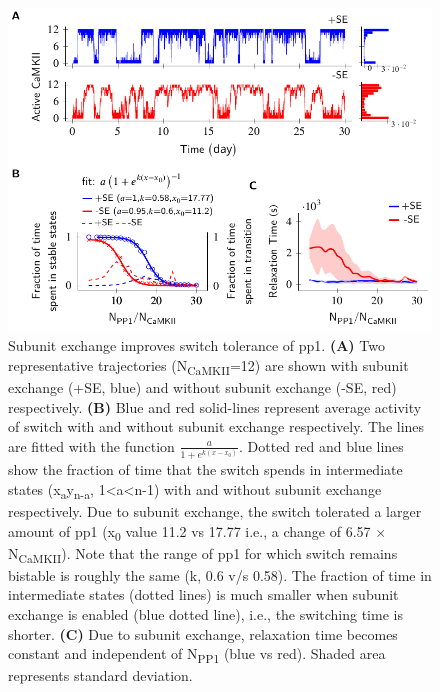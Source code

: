\documentclass[9pt,lineno]{elife}
\newcommand\SUB[2]{#1\textsubscript{#2}}
\begin{document}
\begin{figure}[ht]
    \includegraphics[width=\linewidth]{PaperFigures/elifeFigure2/figure_effect_of_tolerace_140mm.pdf}
    \caption{Subunit exchange improves switch tolerance of \gls{pp1}.
        \textbf{(A)} Two representative trajectories (\SUB{N}{CaMKII}=12) are
        shown with subunit exchange (+SE, blue) and without
        subunit exchange (-SE, red) respectively. \textbf{(B)} Blue and red
        solid-lines represent average activity of switch with and without 
        subunit exchange respectively. The lines are fitted with the 
        function \(\frac{a}{1+e^{k(x-x_0)}}\).
        Dotted red and blue lines show the fraction of time that the switch
        spends in intermediate states (\SUB{x}{a}\SUB{y}{n-a}, 1<a<n-1) with
        and without subunit exchange respectively. Due to subunit exchange,
        the switch tolerated a larger amount of \gls{pp1} 
        (\SUB{x}{0} value 11.2 vs 17.77 i.e., a change of 6.57 $\times$ 
        \SUB{N}{CaMKII}). Note that the range 
        of \gls{pp1} for which switch remains bistable is roughly the 
        same (k, 0.6 v/s 0.58). The fraction of time in intermediate states (dotted lines)
	is much smaller when subunit exchange is enabled (blue dotted line),
        i.e., the switching time is shorter. \textbf{(C)} Due to subunit exchange, relaxation 
        time becomes constant and independent of \SUB{N}{PP1} (blue vs red). 
        Shaded area represents standard deviation.
    }\label{fig:tolerance_pp1}
\end{figure}
\end{document}
